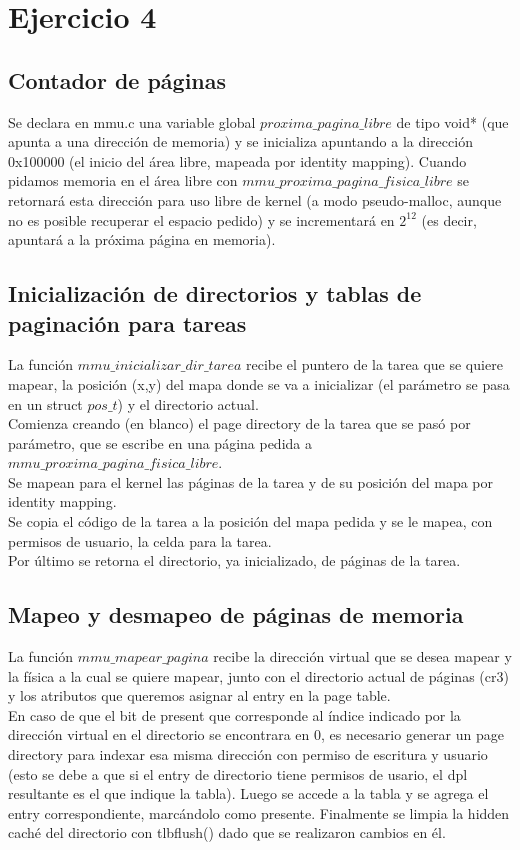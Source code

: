 \section{Ejercicio 4}

\subsection{Contador de páginas}
Se declara en mmu.c una variable global $proxima\_pagina\_libre$ de tipo void* (que apunta a una dirección de memoria) y se inicializa apuntando a la dirección 0x100000 (el inicio del área libre, mapeada por identity mapping). Cuando pidamos memoria en el área libre con $mmu\_proxima\_pagina\_fisica\_libre$ se retornará esta dirección para uso libre de kernel (a modo pseudo-malloc, aunque no es posible recuperar el espacio pedido) y se incrementará en $2^{12}$ (es decir, apuntará a la próxima página en memoria). \\

\subsection{Inicialización de directorios y tablas de paginación para tareas}
La función $mmu\_inicializar\_dir\_tarea$ recibe el puntero de la tarea que se quiere mapear, la posición (x,y) del mapa donde se va a inicializar (el parámetro se pasa en un struct $pos\_t$) y el directorio actual. \\
Comienza creando (en blanco) el page directory de la tarea que se pasó por parámetro, que se escribe en una página pedida a $mmu\_proxima\_pagina\_fisica\_libre$. \\
Se mapean para el kernel las páginas de la tarea y de su posición del mapa por identity mapping.  \\
Se copia el código de la tarea a la posición del mapa pedida y se le mapea, con permisos de usuario, la celda para la tarea. \\
Por último se retorna el directorio, ya inicializado, de páginas de la tarea.

\subsection{Mapeo y desmapeo de páginas de memoria}
La función $mmu\_mapear\_pagina$ recibe la dirección virtual que se desea mapear y la física a la cual se quiere mapear, junto con el directorio actual de páginas (cr3) y los atributos que queremos asignar al entry en la page table. \\
En caso de que el bit de present que corresponde al índice indicado por la dirección virtual en el directorio se encontrara en 0, es necesario generar un page directory para indexar esa misma dirección con permiso de escritura y usuario (esto se debe a que si el entry de directorio tiene permisos de usario, el dpl resultante es el que indique la tabla).
Luego se accede a la tabla y se agrega el entry correspondiente, marcándolo como presente. 
Finalmente se limpia la hidden caché del directorio con tlbflush() dado que se realizaron cambios en él.\\
\\

